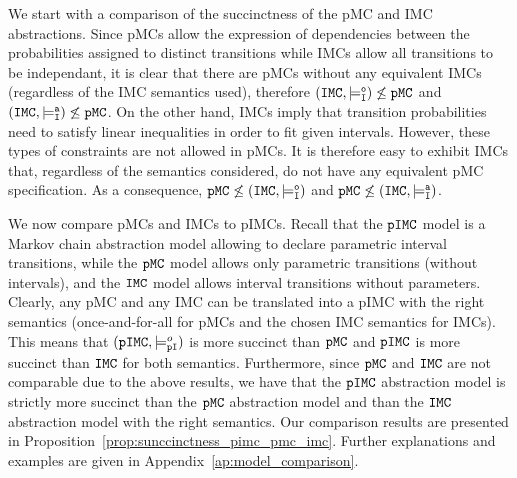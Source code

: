 \documentclass{llncs}
\newcommand{\mc}{\textnormal{MC}}
\newcommand{\imc}{\textnormal{IMC}}
\newcommand{\pimc}{\textnormal{pIMC}}
\newcommand{\pmc}{\textnormal{pMC}}
\newcommand{\pmcSet}{\ensuremath{\tt{pMC}}}
\newcommand{\imcSet}{\ensuremath{\tt{IMC}}}
\newcommand{\pimcSet}{\ensuremath{\tt{pIMC}}}
\newcommand{\satisfactionImcOnce}{\ensuremath{\models^{o}_{\tt{I}}}}
\newcommand{\satisfactionImc}{\ensuremath{\models^{a}_{\tt{I}}}}
\newcommand{\satisfactionPimcOnce}{\ensuremath{\models^o_{\tt{pI}}}}
\newcommand{\comment}[2]{{\color{gray}{\small{\underline{#1:} #2}}}}
\newcommand{\benoit}[1]{\marginpar{\comment{Beno\^it}{#1}}}%
\begin{document}
We start with a comparison of the succinctness of the {\pmc} and {\imc}
abstractions. Since {\pmc}s allow the expression of dependencies
between the probabilities assigned to distinct transitions while
{\imc}s allow all transitions to be independant, it is clear that
there are {\pmc}s without any equivalent {\imc}s (regardless of the
{\imc} semantics used), therefore $(\imcSet,\satisfactionImcOnce) \not
\le \pmcSet$ and $(\imcSet,\satisfactionImc) \not \le \pmcSet$.  On
the other hand, {\imc}s imply that transition probabilities need to
satisfy linear inequalities in order to fit given intervals. However,
these types of constraints are not allowed in {\pmc}s. It is therefore
easy to exhibit {\imc}s that, regardless of the semantics considered,
do not have any equivalent {\pmc} specification. As a consequence, $
\pmcSet \not \le (\imcSet,\satisfactionImcOnce)$ and $ \pmcSet \not
\le (\imcSet,\satisfactionImc)$.



We now compare {\pmc}s and {\imc}s to {\pimc}s. Recall that the
{\pimcSet} model is a Markov chain abstraction model allowing to
declare parametric interval transitions, while the {\pmcSet} model
allows only parametric transitions (without intervals), and the
{\imcSet} model allows interval transitions without parameters.
Clearly, any {\pmc} and any {\imc} can be translated into a {\pimc}
with the right semantics (once-and-for-all for {\pmc}s and the chosen
{\imc} semantics for {\imc}s). This means that
$({\pimcSet},\satisfactionPimcOnce)$ is more succinct than {\pmcSet}
and {\pimcSet} is more succinct than {\imcSet} for both semantics.
Furthermore, since {\pmcSet} and {\imcSet} are not comparable due to
the above results, we have that the {\pimcSet}
abstraction model is strictly more succinct than the {\pmcSet}
abstraction model and than the {\imcSet} abstraction model with the
right semantics. Our comparison results are presented in Proposition~\ref{prop:sunccinctness_pimc_pmc_imc}.
Further explanations and examples
are given in Appendix~\ref{ap:model_comparison}.
\end{document}
